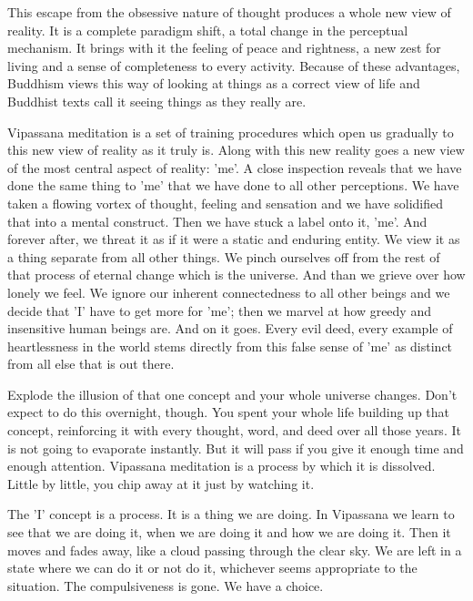 This escape from the obsessive nature of thought produces a whole new view of
reality. It is a complete paradigm shift, a total change in the perceptual
mechanism. It brings with it the feeling of peace and rightness, a new zest for
living and a sense of completeness to every activity. Because of these
advantages, Buddhism views this way of looking at things as a correct view of
life and Buddhist texts call it seeing things as they really are.

Vipassana meditation is a set of training procedures which open us gradually to
this new view of reality as it truly is. Along with this new reality goes a new
view of the most central aspect of reality: 'me'. A close inspection reveals
that we have done the same thing to 'me' that we have done to all other
perceptions. We have taken a flowing vortex of thought, feeling and sensation
and we have solidified that into a mental construct. Then we have stuck a label
onto it, 'me'. And forever after, we threat it as if it were a static and
enduring entity. We view it as a thing separate from all other things. We pinch
ourselves off from the rest of that process of eternal change which is the
universe. And than we grieve over how lonely we feel. We ignore our inherent
connectedness to all other beings and we decide that 'I' have to get more for
'me'; then we marvel at how greedy and insensitive human beings are. And on it
goes. Every evil deed, every example of heartlessness in the world stems
directly from this false sense of 'me' as distinct from all else that is out
there.

Explode the illusion of that one concept and your whole universe changes. Don't
expect to do this overnight, though. You spent your whole life building up that
concept, reinforcing it with every thought, word, and deed over all those years.
It is not going to evaporate instantly. But it will pass if you give it enough
time and enough attention. Vipassana meditation is a process by which it is
dissolved. Little by little, you chip away at it just by watching it.

The 'I' concept is a process. It is a thing we are doing. In Vipassana we learn
to see that we are doing it, when we are doing it and how we are doing it. Then
it moves and fades away, like a cloud passing through the clear sky. We are left
in a state where we can do it or not do it, whichever seems appropriate to the
situation. The compulsiveness is gone. We have a choice.

